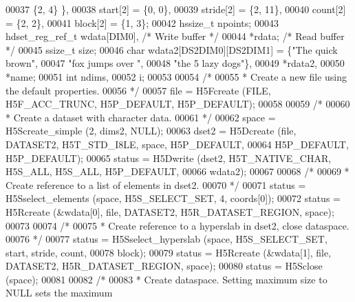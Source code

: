 \begin{DoxyCode}
00037                                          \{2,  4\} \},
00038                         start[2] = \{0, 0\},
00039                         stride[2] = \{2, 11\},
00040                         count[2] = \{2, 2\},
00041                         block[2] = \{1, 3\};
00042     hssize\_t            npoints;
00043     hdset\_reg\_ref\_t     wdata[DIM0],                \textcolor{comment}{/* Write buffer */}
00044                         *rdata;                     \textcolor{comment}{/* Read buffer */}
00045     ssize\_t             size;
00046     \textcolor{keywordtype}{char}                wdata2[DS2DIM0][DS2DIM1] = \{\textcolor{stringliteral}{"The quick brown"},
00047                                                     \textcolor{stringliteral}{"fox jumps over "},
00048                                                     \textcolor{stringliteral}{"the 5 lazy dogs"}\},
00049                         *rdata2,
00050                         *name;
00051     \textcolor{keywordtype}{int}                 ndims,
00052                         i;
00053 
00054     \textcolor{comment}{/*}
00055 \textcolor{comment}{     * Create a new file using the default properties.}
00056 \textcolor{comment}{     */}
00057     file = H5Fcreate (FILE, H5F\_ACC\_TRUNC, H5P\_DEFAULT, H5P\_DEFAULT);
00058 
00059     \textcolor{comment}{/*}
00060 \textcolor{comment}{     * Create a dataset with character data.}
00061 \textcolor{comment}{     */}
00062     space = H5Screate\_simple (2, dims2, NULL);
00063     dset2 = H5Dcreate (file, DATASET2, H5T\_STD\_I8LE, space, H5P\_DEFAULT,
00064                 H5P\_DEFAULT, H5P\_DEFAULT);
00065     status = H5Dwrite (dset2, H5T\_NATIVE\_CHAR, H5S\_ALL, H5S\_ALL, H5P\_DEFAULT,
00066                 wdata2);
00067 
00068     \textcolor{comment}{/*}
00069 \textcolor{comment}{     * Create reference to a list of elements in dset2.}
00070 \textcolor{comment}{     */}
00071     status = H5Sselect\_elements (space, H5S\_SELECT\_SET, 4, coords[0]);
00072     status = H5Rcreate (&wdata[0], file, DATASET2, H5R\_DATASET\_REGION, space);
00073 
00074     \textcolor{comment}{/*}
00075 \textcolor{comment}{     * Create reference to a hyperslab in dset2, close dataspace.}
00076 \textcolor{comment}{     */}
00077     status = H5Sselect\_hyperslab (space, H5S\_SELECT\_SET, start, stride, count,
00078                 block);
00079     status = H5Rcreate (&wdata[1], file, DATASET2, H5R\_DATASET\_REGION, space);
00080     status = H5Sclose (space);
00081 
00082     \textcolor{comment}{/*}
00083 \textcolor{comment}{     * Create dataspace.  Setting maximum size to NULL sets the maximum}

\end{DoxyCode}
